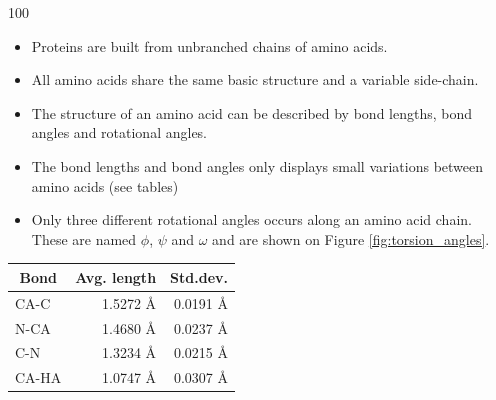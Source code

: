 \documentclass[a0,portrait]{a0poster}
\begin{document}
\begin{GridBlockFill}{0}{46}{100}

\renewcommand{\labelitemi}{--\ }

  \begin{multicols}{2}
\begin{minipage}{\linewidth} 
    \begin{multicols}{2}

    \begin{itemize}
    \item Proteins are built from unbranched chains of amino acids.
    \item All amino acids share
      the same basic structure and a variable side-chain.
    \item The structure of an amino acid can be described by bond lengths,
      bond angles and rotational angles.
    \item The bond lengths and bond angles only displays small variations
      between amino acids (see tables)
    \item Only three different rotational angles occurs along an amino
      acid chain. These are named $\phi$, $\psi$ and $\omega$ and are
      shown on Figure \ref{fig:torsion_angles}.
    \end{itemize} 
   \end{multicols}


\begin{multicols}{2}


\begin{minipage}{\linewidth} 
\centering

  \vspace{7mm}
  \begin{tabular}{lrr}
    \multicolumn{1}{c}{Bond} & \multicolumn{1}{c}{Avg. length} & \multicolumn{1}{c}{Std.dev.} \\ \midrule
    CA-C  & 1.5272 Å & 0.0191 Å\\
    N-CA  & 1.4680 Å & 0.0237 Å\\
    C-N   & 1.3234 Å & 0.0215 Å\\
    CA-HA & 1.0747 Å & 0.0307 Å\\
  \end{tabular}
  \vspace{4mm}
  \label{tab:average_bond_lengths}
\end{minipage}



\end{multicols}
\end{minipage}
\end{multicols}
\end{GridBlockFill}
\end{document}
